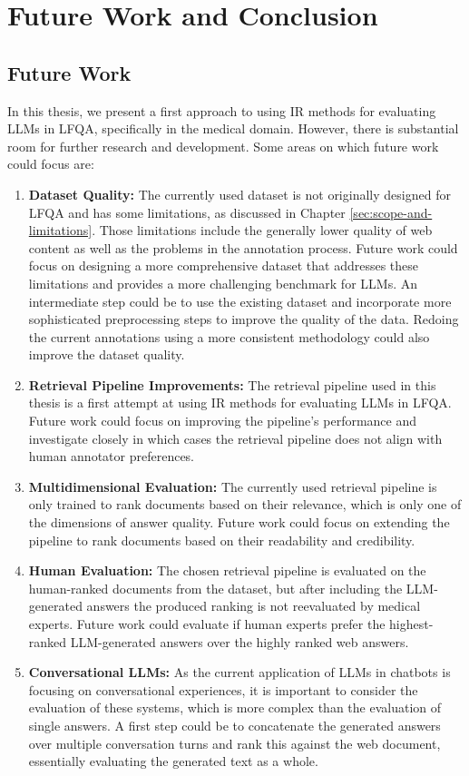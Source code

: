 \chapter{Future Work and Conclusion}\label{conclusion}

\section{Future Work}
In this thesis, we present a first approach to using IR methods for evaluating LLMs in LFQA, specifically in the medical domain.
However, there is substantial room for further research and development.
Some areas on which future work could focus are:

\begin{enumerate}
    \item \textbf{Dataset Quality:} The currently used dataset is not originally designed for LFQA and has some limitations, as discussed in Chapter \ref{sec:scope-and-limitations}. Those limitations include the generally lower quality of web content as well as the problems in the annotation process. Future work could focus on designing a more comprehensive dataset that addresses these limitations and provides a more challenging benchmark for LLMs. An intermediate step could be to use the existing dataset and incorporate more sophisticated preprocessing steps to improve the quality of the data. Redoing the current annotations using a more consistent methodology could also improve the dataset quality.
    \item \textbf{Retrieval Pipeline Improvements:} The retrieval pipeline used in this thesis is a first attempt at using IR methods for evaluating LLMs in LFQA. Future work could focus on improving the pipeline's performance and investigate closely in which cases the retrieval pipeline does not align with human annotator preferences. 
    \item \textbf{Multidimensional Evaluation:} The currently used retrieval pipeline is only trained to rank documents based on their relevance, which is only one of the dimensions of answer quality. Future work could focus on extending the pipeline to rank documents based on their readability and credibility.
    \item \textbf{Human Evaluation:} The chosen retrieval pipeline is evaluated on the human-ranked documents from the dataset, but after including the LLM-generated answers the produced ranking is not reevaluated by medical experts. Future work could evaluate if human experts prefer the highest-ranked LLM-generated answers over the highly ranked web answers.
    \item \textbf{Conversational LLMs:} As the current application of LLMs in chatbots is focusing on conversational experiences, it is important to consider the evaluation of these systems, which is more complex than the evaluation of single answers. A first step could be to concatenate the generated answers over multiple conversation turns and rank this against the web document, essentially evaluating the generated text as a whole.
\end{enumerate}

